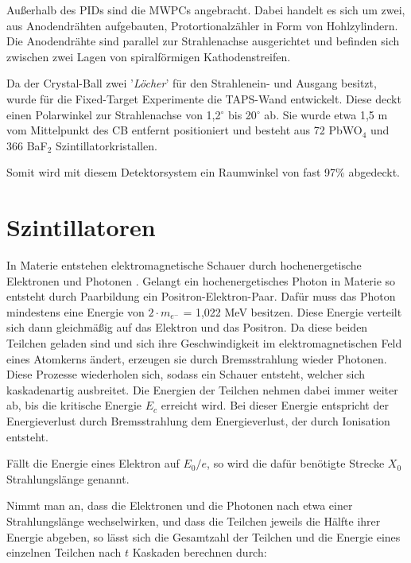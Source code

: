 \documentclass[a4paper,11pt,oneside,final,german,openbib,pdftex]{scrbook}
\begin{document}
{Au{\ss}erhalb des PIDs sind die MWPCs angebracht. Dabei handelt es sich um zwei, aus Anodendr\"ahten aufgebauten, Protortionalz\"ahler in Form von Hohlzylindern. Die Anodendr\"ahte sind parallel zur Strahlenachse ausgerichtet und befinden sich zwischen zwei Lagen von spiralf\"ormigen Kathodenstreifen. 

Da der Crystal-Ball zwei '\textit{L\"ocher}' f\"ur den Strahlenein- und Ausgang besitzt, wurde f\"ur die Fixed-Target Experimente die TAPS-Wand entwickelt.
Diese deckt einen Polarwinkel zur Strahlenachse von 1,2$^{\circ}$ bis 20$^{\circ}$ ab. Sie wurde etwa 1,5 m vom Mittelpunkt des CB entfernt positioniert und besteht aus 72 PbWO$_4$ und 366 BaF$_2$ Szintillatorkristallen. 

Somit wird mit diesem Detektorsystem ein Raumwinkel von fast 97\% abgedeckt.

\section{Szintillatoren}
\label{sec:Szintillatoren}

In Materie entstehen elektromagnetische Schauer durch hochenergetische Elektronen und Photonen \cite{Leo87}.
Gelangt ein hochenergetisches Photon in Materie so entsteht durch Paarbildung ein Positron-Elektron-Paar. Dafür muss das Photon mindestens eine Energie von $2\cdot m_{e^-}$ = 1,022 MeV besitzen. Diese Energie verteilt sich dann gleichmäßig auf das Elektron und das Positron. Da diese beiden Teilchen geladen sind und sich ihre Geschwindigkeit im elektromagnetischen Feld eines Atomkerns ändert, erzeugen sie durch Bremsstrahlung wieder Photonen. Diese Prozesse wiederholen sich, sodass ein Schauer entsteht, welcher sich kaskadenartig ausbreitet. Die Energien der Teilchen nehmen dabei immer weiter ab, bis die kritische Energie $E_c$ erreicht wird. Bei dieser Energie entspricht der Energieverlust durch Bremsstrahlung dem Energieverlust, der durch Ionisation entsteht.

Fällt die Energie eines Elektron auf $E_0/e$, so wird die dafür benötigte Strecke $X_0$ Strahlungslänge genannt.
\newline

Nimmt man an, dass die Elektronen und die Photonen nach etwa einer Strahlungslänge wechselwirken, und dass die Teilchen jeweils die Hälfte ihrer Energie abgeben, so lässt sich die Gesamtzahl der Teilchen und die Energie eines einzelnen Teilchen nach $t$ Kaskaden berechnen durch\cite{Leo87}:

}
\end{document}
